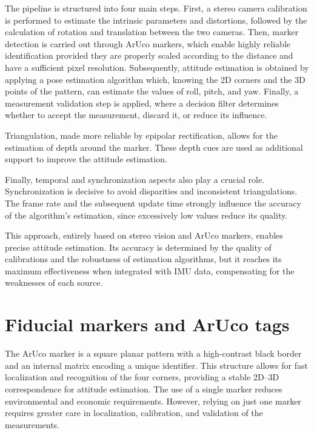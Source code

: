 The pipeline is structured into four main steps. First, a stereo camera calibration is performed to estimate the intrinsic parameters and distortions, followed by the calculation of rotation and translation between the two cameras. Then, marker detection is carried out through ArUco markers, which enable highly reliable identification provided they are properly scaled according to the distance and have a sufficient pixel resolution. Subsequently, attitude estimation is obtained by applying a pose estimation algorithm which, knowing the 2D corners and the 3D points of the pattern, can estimate the values of roll, pitch, and yaw. Finally, a measurement validation step is applied, where a decision filter determines whether to accept the measurement, discard it, or reduce its influence.

Triangulation, made more reliable by epipolar rectification, allows for the estimation of depth around the marker. 
These depth cues are used as additional support to improve the attitude estimation.

Finally, temporal and synchronization aspects also play a crucial role. 
Synchronization is decisive to avoid disparities and inconsistent triangulations. 
The frame rate and the subsequent update time strongly influence the accuracy of the algorithm’s estimation, 
since excessively low values reduce its quality.

This approach, entirely based on stereo vision and ArUco markers, enables precise attitude estimation. 
Its accuracy is determined by the quality of calibrations and the robustness of estimation algorithms, 
but it reaches its maximum effectiveness when integrated with IMU data, 
compensating for the weaknesses of each source.

\section{Fiducial markers and ArUco tags}

The ArUco marker is a square planar pattern with a high-contrast black border and an internal matrix encoding a unique identifier. This structure allows for fast localization and recognition of the four corners, providing a stable 2D--3D correspondence for attitude estimation. The use of a single marker reduces environmental and economic requirements. However, relying on just one marker requires greater care in localization, calibration, and validation of the measurements.

